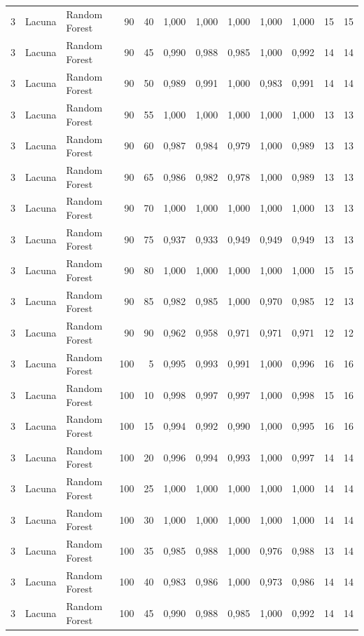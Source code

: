 \begin{longtable}{@{}rllrrrrrrrrr@{}}
3 & Lacuna & Random Forest & 90 & 40 & 1,000 & 1,000 & 1,000 & 1,000 & 1,000 & 15 & 15 \\
3 & Lacuna & Random Forest & 90 & 45 & 0,990 & 0,988 & 0,985 & 1,000 & 0,992 & 14 & 14 \\
3 & Lacuna & Random Forest & 90 & 50 & 0,989 & 0,991 & 1,000 & 0,983 & 0,991 & 14 & 14 \\
3 & Lacuna & Random Forest & 90 & 55 & 1,000 & 1,000 & 1,000 & 1,000 & 1,000 & 13 & 13 \\
3 & Lacuna & Random Forest & 90 & 60 & 0,987 & 0,984 & 0,979 & 1,000 & 0,989 & 13 & 13 \\
3 & Lacuna & Random Forest & 90 & 65 & 0,986 & 0,982 & 0,978 & 1,000 & 0,989 & 13 & 13 \\
3 & Lacuna & Random Forest & 90 & 70 & 1,000 & 1,000 & 1,000 & 1,000 & 1,000 & 13 & 13 \\
3 & Lacuna & Random Forest & 90 & 75 & 0,937 & 0,933 & 0,949 & 0,949 & 0,949 & 13 & 13 \\
3 & Lacuna & Random Forest & 90 & 80 & 1,000 & 1,000 & 1,000 & 1,000 & 1,000 & 15 & 15 \\
3 & Lacuna & Random Forest & 90 & 85 & 0,982 & 0,985 & 1,000 & 0,970 & 0,985 & 12 & 13 \\
3 & Lacuna & Random Forest & 90 & 90 & 0,962 & 0,958 & 0,971 & 0,971 & 0,971 & 12 & 12 \\
3 & Lacuna & Random Forest & 100 & 5 & 0,995 & 0,993 & 0,991 & 1,000 & 0,996 & 16 & 16 \\
3 & Lacuna & Random Forest & 100 & 10 & 0,998 & 0,997 & 0,997 & 1,000 & 0,998 & 15 & 16 \\
3 & Lacuna & Random Forest & 100 & 15 & 0,994 & 0,992 & 0,990 & 1,000 & 0,995 & 16 & 16 \\
3 & Lacuna & Random Forest & 100 & 20 & 0,996 & 0,994 & 0,993 & 1,000 & 0,997 & 14 & 14 \\
3 & Lacuna & Random Forest & 100 & 25 & 1,000 & 1,000 & 1,000 & 1,000 & 1,000 & 14 & 14 \\
3 & Lacuna & Random Forest & 100 & 30 & 1,000 & 1,000 & 1,000 & 1,000 & 1,000 & 14 & 14 \\
3 & Lacuna & Random Forest & 100 & 35 & 0,985 & 0,988 & 1,000 & 0,976 & 0,988 & 13 & 14 \\
3 & Lacuna & Random Forest & 100 & 40 & 0,983 & 0,986 & 1,000 & 0,973 & 0,986 & 14 & 14 \\
3 & Lacuna & Random Forest & 100 & 45 & 0,990 & 0,988 & 0,985 & 1,000 & 0,992 & 14 & 14 \\

\end{longtable}
